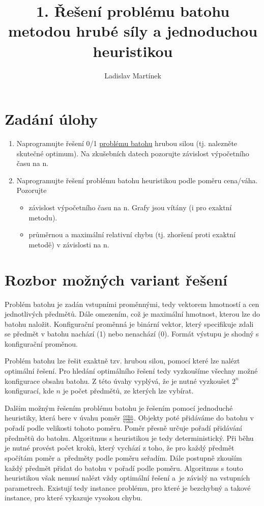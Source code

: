 \documentclass[11pt]{article}
\begin{document}

\title{1. Řešení problému batohu metodou hrubé síly a jednoduchou heuristikou}
\author{Ladislav Martínek}
\date{}
\maketitle
 
\section{Zadání úlohy} 


\begin{enumerate}
\item Naprogramujte řešení 0/1 \href{http://www.csc.kth.se/~viggo/wwwcompendium/node211.html#7374}{problému batohu} hrubou silou (tj. nalezněte skutečné optimum). Na zkušebních datech pozorujte závislost výpočetního času na n. 
\item Naprogramujte řešení problému batohu   heuristikou podle poměru cena/váha. Pozorujte

\begin{itemize}
\item závislost výpočetního času na n. Grafy jsou vítány (i pro exaktní metodu).
\item průměrnou a maximální relativní chybu (tj. zhoršení proti exaktní metodě) v závislosti na n.
\end{itemize}
\end{enumerate}  

\section{Rozbor možných variant řešení}

Problém batohu je zadán vstupními proměnnými, tedy vektorem hmotností a cen jednotlivých předmětů. Dále omezením, což je maximální hmotnost, kterou lze do batohu naložit. Konfigurační proměnná je binární vektor, který specifikuje zdali se předmět v batohu nachází (1) nebo nenachází (0). Formát výstupu je shodný s konfigurační proměnou.

Problém batohu lze řešit exaktně tzv. hrubou silou, pomocí které lze nalézt optimální řešení. Pro hledání optimálního řešení tedy vyzkoušíme všechny možné konfigurace obsahu batohu. Z této úvahy vyplývá, že je nutné vyzkoušet $2^n$ konfigurací, kde $n$ je počet předmětů, ze kterých lze vybírat. 

Dalším možným řešením problému batohu je řešením pomocí jednoduché heuristiky, která bere v úvahu poměr $\frac{\text{cena}}{\text{váha}}$. Objekty poté přidáváme do batohu v pořadí podle velikosti tohoto poměru. Poměr přesně určuje pořadí přidávání předmětů do batohu. Algoritmus s heuristikou je tedy deterministický. Při běhu je nutné provést počet kroků, který vychází z toho, že pro každý předmět spočítám poměr a~předměty podle poměru seřadím. Dále postupně zkouším každý předmět přidat do batohu v pořadí podle poměru. Algoritmus s touto heuristikou však nemusí nalézt vždy optimální řešení a~je závislý na vstupních parametrech. Existují tedy instance problému, pro které je bezchybný a takové instance, pro které vykazuje vysokou chybu.
\end{document}

